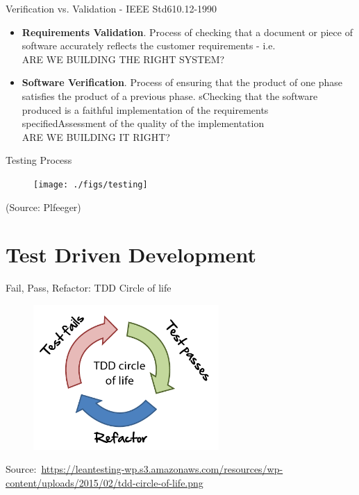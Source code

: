 \documentclass[11pt, xcolor=svgnames]{beamer}
\providecommand{\alert}[1]{\textbf{#1}}
\begin{document}

\begin{frame}[fragile]{Verification vs. Validation - IEEE Std610.12-1990}

\begin{itemize}
 \item \alert{Requirements Validation}. Process of checking that a document or piece of software accurately reflects the customer requirements - i.e. \\
 ARE WE BUILDING THE RIGHT SYSTEM?

\item \alert{Software Verification}. Process of ensuring that the product of one phase satisfies the product of a previous phase. sChecking that the software produced is a faithful implementation of the requirements specifiedAssessment of the quality of the implementation \\
ARE WE BUILDING IT RIGHT?
\end{itemize}

\end{frame}




\begin{frame}{Testing Process}

\begin{figure}
 \texttt{[image: ./figs/testing]}
\end{figure} 
\tiny{(Source: Plfeeger)}
\end{frame}




\section{Test Driven Development}




\begin{frame}{Fail, Pass, Refactor:  TDD Circle of life}

\begin{figure}
 \includegraphics[width=200pt]{./figs/tdd-circle-of-life.png}
\end{figure} 


\tiny{Source:~\url{https://leantesting-wp.s3.amazonaws.com/resources/wp-content/uploads/2015/02/tdd-circle-of-life.png}}

\end{frame}
\end{document}
